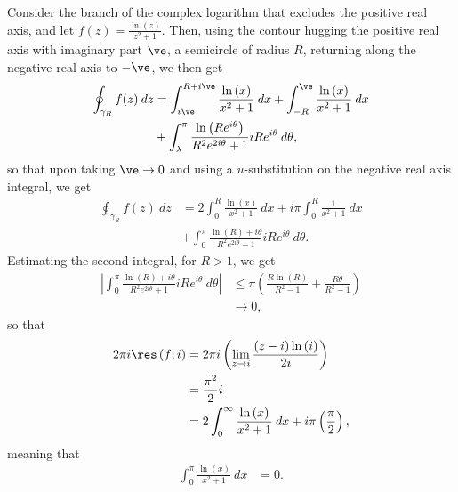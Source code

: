 \documentclass[10pt]{mypackage}
\begin{document}
\begin{solution}
  Consider the branch of the complex logarithm that excludes the positive real axis, and let $f(z) = \frac{\ln(z)}{z^2 + 1}$. Then, using the contour hugging the positive real axis with imaginary part $\ve$, a semicircle of radius $R$, returning along the negative real axis to $-\ve$, we then get
  \begin{align*}
    \oint_{\gamma_R}^{} f(z)\:dz &= \int_{i\ve}^{R + i\ve} \frac{\ln\left( x \right)}{x^2 + 1}\:dx + \int_{-R}^{\ve} \frac{\ln\left( x \right)}{x^2 + 1}\:dx\\
                                                   &+ \int_{\lambda}^{\pi} \frac{\ln\left( Re^{i\theta} \right)}{R^2e^{2i\theta} + 1}iRe^{i\theta}\:d\theta,
  \end{align*}
  so that upon taking $\ve\rightarrow 0$ and using a $u$-substitution on the negative real axis integral, we get
  \begin{align*}
    \oint_{\gamma_R}^{} f(z)\:dz &= 2 \int_{0}^{R} \frac{\ln(x)}{x^2 + 1}\:dx + i\pi \int_{0}^{R} \frac{1}{x^2 + 1}\:dx\\
                                 &+ \int_{0}^{\pi} \frac{\ln\left( R \right) + i\theta}{R^2e^{2i\theta} + 1}iRe^{i\theta}\:d\theta.
  \end{align*}
  Estimating the second integral, for $R > 1$, we get
  \begin{align*}
    \left\vert \int_{0}^{\pi} \frac{\ln\left( R \right) + i\theta}{R^2e^{2i\theta} + 1}iRe^{i\theta}\:d\theta \right\vert &\leq \pi\left( \frac{R\ln\left( R \right)}{R^2 - 1} + \frac{R\theta}{R^2 - 1} \right)\\
                                                                                                                                  &\rightarrow 0,
  \end{align*}
  so that
  \begin{align*}
    2\pi i \res\left( f;i \right) &= 2\pi i \left( \lim_{z\rightarrow i} \frac{\left( z-i \right)\ln\left( i \right)}{2i} \right)\\
                                  &= \frac{\pi^2}{2}i\\
                                  &= 2 \int_{0}^{\infty} \frac{\ln\left( x \right)}{x^2 + 1}\:dx + i\pi \left( \frac{\pi}{2} \right),
  \end{align*}
  meaning that
  \begin{align*}
    \int_{0}^{\pi} \frac{\ln\left( x \right)}{x^2 + 1}\:dx &= 0.
  \end{align*}
\end{solution}
\end{document}
